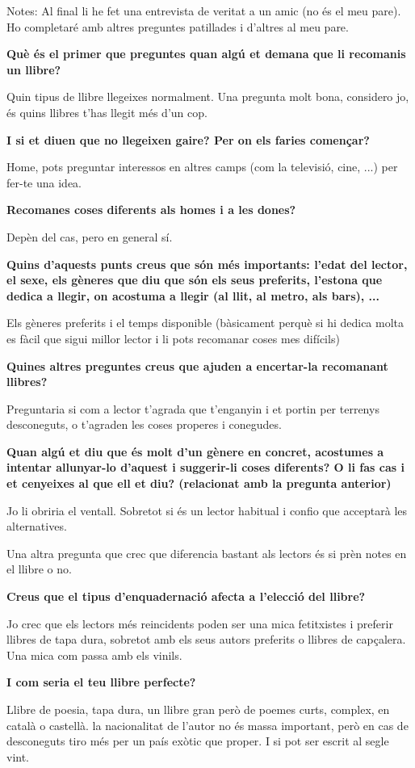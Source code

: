 
Notes: Al final li he fet una entrevista de veritat a un amic (no és el meu pare). Ho completaré amb altres preguntes patillades i d'altres al meu pare.


\textbf{Què és el primer que preguntes quan algú et demana que li recomanis un llibre?}

  Quin tipus de llibre llegeixes normalment. Una pregunta molt bona, considero jo, és quins llibres t'has llegit més d'un cop.

\textbf{I si et diuen que no llegeixen gaire? Per on els faries començar?}

  Home, pots preguntar interessos en altres camps (com la televisió, cine, ...) per fer-te una idea.

\textbf{Recomanes coses diferents als homes i a les dones?}

  Depèn del cas, pero en general sí.

\textbf{Quins d'aquests punts creus que són més importants: l'edat del lector, el sexe, els gèneres que diu que són els seus preferits, l'estona que dedica a llegir, on acostuma a llegir (al llit, al metro, als bars), ...}

  Els gèneres preferits i el temps disponible (bàsicament perquè si hi dedica molta es fàcil que sigui millor lector i li pots recomanar coses mes difícils)

\textbf{Quines altres preguntes creus que ajuden a encertar-la recomanant llibres?}

Preguntaria si com a lector t'agrada que t'enganyin i et portin per terrenys desconeguts, o t'agraden les coses properes i conegudes.

\textbf{Quan algú et diu que és molt d'un gènere en concret, acostumes a intentar allunyar-lo d'aquest i suggerir-li coses diferents? O li fas cas i et cenyeixes al que ell et diu? (relacionat amb la pregunta anterior)}

 Jo li obriria el ventall. Sobretot si és un lector habitual i confio que acceptarà les alternatives.

 Una altra pregunta que crec que diferencia bastant als lectors és si prèn notes en el llibre o no.

\textbf{Creus que el tipus d'enquadernació afecta a l'elecció del llibre?}

  Jo crec que els lectors més reincidents poden ser una mica fetitxistes i preferir llibres de tapa dura, sobretot amb els seus autors preferits o llibres de capçalera. Una mica com passa amb els vinils.

\textbf{I com seria el teu llibre perfecte?}

  Llibre de poesia, tapa dura, un llibre gran però de poemes curts, complex, en català o castellà. la nacionalitat de l'autor no és massa important, però en cas de desconeguts tiro més per un país exòtic que proper. I si pot ser escrit al segle vint.
